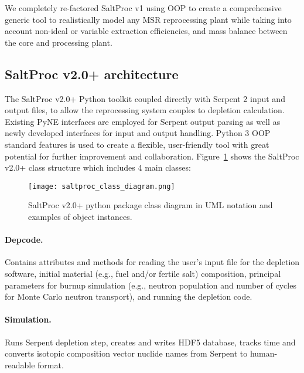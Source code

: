 We completely re-factored SaltProc v1 using \gls{OOP} to create a 
comprehensive generic tool to realistically model any \gls{MSR} 
reprocessing plant while taking into account non-ideal or variable extraction 
efficiencies, and mass balance between the core and processing plant.

\subsection{SaltProc v2.0+ architecture}
The SaltProc v2.0+ Python toolkit coupled directly with Serpent 2 input 
and output files, to allow the reprocessing system couples to depletion 
calculation. 
Existing PyNE interfaces are employed for Serpent output parsing as 
well as newly developed interfaces for input and output handling. 
Python 3 \gls{OOP} standard features is used to create a flexible, 
user-friendly tool with great potential for further improvement and 
collaboration. 
Figure~\ref{fig:saltproc_class} shows the SaltProc v2.0+ class structure 
which includes 4 main classes:
\begin{figure}[ht!] %
	\texttt{[image: saltproc\_class\_diagram.png]}
	\vspace{-0.35in}
	\caption{SaltProc v2.0+ python package class diagram in UML notation 
		and examples of object instances.}
	\label{fig:saltproc_class}
\end{figure}
\paragraph{Depcode.}Contains attributes and methods for 
reading the user's input file for the depletion software, initial 
material (e.g., fuel and/or fertile salt) composition, principal 
parameters for 
burnup simulation (e.g., neutron population and number of cycles for Monte 
Carlo neutron transport), and running the depletion code.
\paragraph{Simulation.} Runs Serpent depletion step, 
creates and writes HDF5 database, tracks time and converts 
isotopic composition vector nuclide names from Serpent to human-readable 
format.
